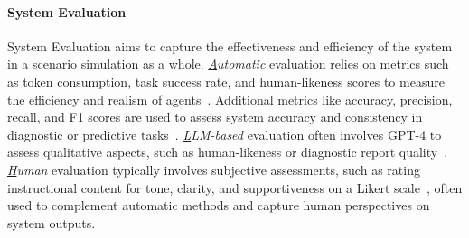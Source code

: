 \paragraph{System Evaluation}
System Evaluation aims to capture the effectiveness and efficiency of the system in a scenario simulation as a whole. \textit{{\ul Automatic}} evaluation relies on metrics such as token consumption, task success rate, and human-likeness scores to measure the efficiency and realism of agents~\cite{tan2024true}. Additional metrics like accuracy, precision, recall, and F1 scores are used to assess system accuracy and consistency in diagnostic or predictive tasks~\cite{fan2024ai}. \textit{{\ul LLM-based}} evaluation often involves GPT-4 to assess qualitative aspects, such as human-likeness or diagnostic report quality~\cite{tan2024true,li2024agent}. \textit{{\ul Human}} evaluation typically involves subjective assessments, such as rating instructional content for tone, clarity, and supportiveness on a Likert scale~\cite{yu2024mooc}, often used to complement automatic methods and capture human perspectives on system outputs.


